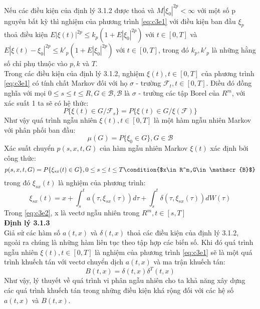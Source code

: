 \documentclass[14pt,a4paper]{article}
\numberwithin{equation}{section}
\begin{document}
Nếu các điều kiện của định lý 3.1.2 được thoả và $M|\xi_0|^{2p}<\infty$ với một số p nguyên bất kỳ thì nghiệm của phương trình \eqref{eq:c3e1} với điều kiện ban đầu $\xi_p$ thoả điều kiện $E|\xi(t)|^{2p}\leq k_p(1+E|\xi_0|^{2p})$ với $t\in[0,T]$ và $E|\xi(t)-\xi_0|^{2p}\leq k'_p(1+E|\xi_0|^{2p})$ với $t\in[0,T]$, trong đó $k_p,k'_p$ là những hằng số chỉ phụ thuộc vào $p,k$ và $T$.\\
Trong các điều kiện của định lý 3.1.2, nghiệm $\xi(t),t\in[0,T]$ của phương trình \eqref{eq:c3e1} có tính chất Markov đối với họ $\sigma$ - trường ${\mathscr{F}_t,t\in[0,T]}$. Điều đó đồng nghĩa với mọi $0\leq s\leq t\leq R,G\in \mathscr{B},\mathscr{B}$ là $\sigma$ - trường các tập Borel của $R^m$, với xác suất 1 ta sẽ có hệ thức:
\begin{equation*}
	P\{\xi(t)\in G/\mathscr{F}_s\}=P\{\xi(t)\in G/\xi(\mathscr{F})\}
\end{equation*}
Như vậy quá trình ngẫu nhiên $\xi(t),t\in[0,T]$ là một hàm ngẫu nhiên Markov với phân phối ban đầu:
\begin{equation*}
	\mu(G)=P\{\xi_0\in G\},G\in \mathscr{B}
\end{equation*}
Xác suất chuyển $p(s,x,t,G)$ của hàm ngẫu nhiên Markov $\xi(t)$ xác định bởi công thức:
\begin{equation*}
	p(s,x,t,G)=P\{\xi_{sx}(t)\in G\},0\leq s\leq t\leq T \condition{$x\in R^m,G\in\mathscr{B}$}
\end{equation*}
trong đó $\xi_{sx}(t)$ là nghiệm của phương trình:
\begin{equation}\label{eq:c3e2}
	\xi_{sx}(t)=x+\int_{s}^{t}a(\tau,\xi_{sx}(\tau))d\tau+\int_{s}^{t}\delta(\tau,\xi_{sx}(\tau))dW(\tau)
\end{equation}
Trong \eqref{eq:c3e2}, x là vectơ ngẫu nhiên trong $R^m,t\in[s,T]$\\
\textbf{Định lý 3.1.3}\\
Giả sử các hàm số $a(t,x)$ và $\delta(t,x)$ thoả các điều kiện của định lý 3.1.2, ngoài ra chúng là những hàm liên tục theo tập hợp các biến số. Khi đó quá trình ngẫu nhiên $\xi(t),t\in[0,T]$ là nghiệm của phương trình \eqref{eq:c3e1} sẽ là một quá trình khuếch tán với vectơ chuyển dịch $a(t,x)$ và ma trận khuếch tán:
\begin{equation*}
	B(t,x)=\delta(t,x)\delta^T(t,x)
\end{equation*}
Như vậy, lý thuyết về quá trình vi phân ngẫu nhiên cho ta khả năng xây dựng các quá trình khuếch tán trong những điều kiện khá rộng đối với các hệ số $a(t,x)$ và $B(t,x)$.\\
\end{document}
